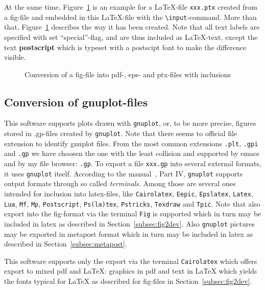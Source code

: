 \documentclass[12pt]{article}
\begin{document}
At the same time, Figure~\ref{fig:fig2dev} is an example 
for a \LaTeX-file {\tt xxx.ptx} created from a fig-file 
and embedded in this \LaTeX-file 
with the {\tt\textbackslash input}-command. 
More than that, 
Figure~\ref{fig:fig2dev} describes the way it has been created. 
Note that all text labels are specified with set ``special''-flag, 
and are thus included as \LaTeX-text, 
except the text {\bf\tiny postscript} 
which is typeset with a postscipt font to make the difference visible. 


\begin{figure}[htb]
\begin{center}

\end{center}
\caption{\label{fig:fig2dev}Conversion of a fig-file 
into pdf-, eps- and ptx-files with inclusions}
\end{figure}


\subsection{Conversion of gnuplot-files}\label{subsec:gnuplot2pdf}

This software supports plots drawn with {\tt gnuplot}, or, to be more precise, 
figures stored in .gp-files created by {\tt gnuplot}. 
Note that there seems to official file extension 
to identify gnuplot files. 
From the most common extensions {\tt.plt}, {\tt.gpi} and {\tt.gp} 
we have choosen the one with the least collision 
and supported by emacs and by my file browser: {\tt.gp}. 
To export a file {\tt xxx.gp} into several external formats, 
it uses {\tt gnuplot} itself. 
According to the manual~\cite{GnuPlot}, Part IV, 
{\tt gnuplot} supports output formats through so called {\em terminals}. 
Among those are several ones intended for inclusion into latex-files, 
like {\tt Cairolatex}, {\tt Eepic}, {\tt Epslatex}, {\tt Latex}, {\tt Lua}, 
{\tt Mf}, {\tt Mp}, {\tt Postscript}, {\tt Ps(la)tex}, {\tt Pstricks}, 
{\tt Texdraw} and {\tt Tpic}. 
Note that also export into the fig-format via the terminal {\tt Fig} 
is supported which in turn may be included in latex 
as described in Section~\ref{subsec:fig2dev}. 
Also {\tt gnuplot} pictures may be exported in metapost format 
which in turn may be included in latex 
as described in Section~\ref{subsec:metapost}. 

This software supports only the export via the terminal {\tt Cairolatex} 
which offers export to mixed pdf and \LaTeX: 
graphics in pdf and text in \LaTeX{}
which yields the fonts typical for \LaTeX{} 
as described for fig-files in Section~\ref{subsec:fig2dev}. 
\end{document}
